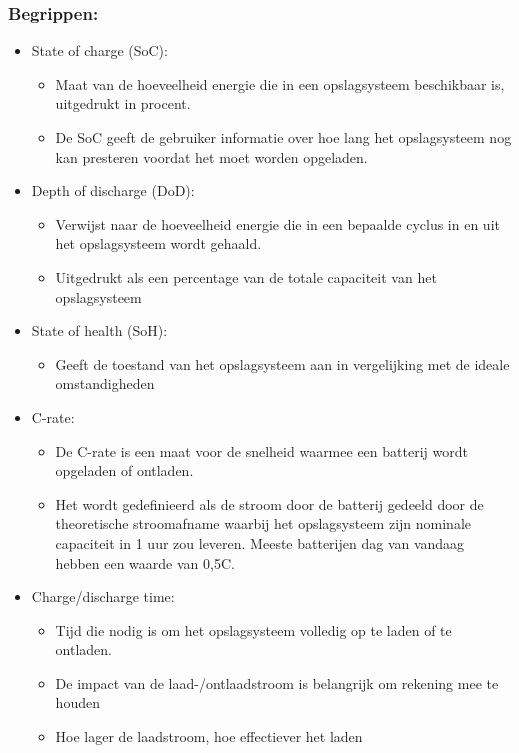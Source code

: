 \documentclass[12pt]{article}
\begin{document}
\subsubsection{Begrippen:}
\begin{itemize}
    \item State of charge (SoC):\begin{itemize}
        \item Maat van de hoeveelheid energie die in een opslagsysteem beschikbaar is, uitgedrukt in procent. 
        \item De SoC geeft de gebruiker informatie over hoe lang het opslagsysteem nog kan presteren voordat het moet worden opgeladen.
    \end{itemize}
    \item Depth of discharge (DoD):\begin{itemize}
        \item Verwijst naar de hoeveelheid energie die in een bepaalde cyclus in en uit het
        opslagsysteem wordt gehaald. 
        \item Uitgedrukt als een percentage van de totale capaciteit van het opslagsysteem
    \end{itemize}
    \item State of health (SoH):\begin{itemize}
        \item Geeft de toestand van het opslagsysteem aan in vergelijking met de ideale omstandigheden
    \end{itemize}
    \item C-rate:\begin{itemize}
        \item De C-rate is een maat voor de snelheid waarmee een batterij wordt opgeladen of ontladen. 
        \item Het wordt gedefinieerd als de stroom door de batterij gedeeld door de theoretische stroomafname waarbij het opslagsysteem zijn nominale capaciteit in 1 uur zou leveren. Meeste batterijen dag van vandaag hebben een waarde van 0,5C.
    \end{itemize}
    \item Charge/discharge time:\begin{itemize}
        \item Tijd die nodig is om het opslagsysteem volledig op te laden of te ontladen. 
        \item De impact van de laad-/ontlaadstroom is belangrijk om rekening mee te houden 
        \item Hoe lager de laadstroom, hoe effectiever het laden 

\end{itemize}
\end{itemize}
\end{document}
